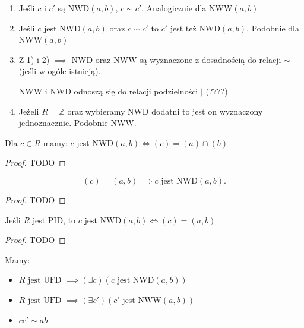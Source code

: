 \begin{remark}
	\begin{enumerate}[label=\arabic*)]
		\item Jeśli $c$ i $c'$ są $\text{NWD}\left( a,b \right) $, $c\sim c' $. Analogicznie dla $\text{NWW}\left( a,b \right) $
		\item Jeśli $c$ jest $\text{NWD}\left( a,b \right) $ oraz $c\sim c' $ to $c'$ jest też $\text{NWD}\left( a,b \right) $. Podobnie dla $\text{NWW}\left( a,b \right) $
		\item Z 1) i 2)  $\implies$ NWD oraz NWW są wyznaczone z dosadnością do relacji $\sim  $ (jeśli w ogóle istnieją).

			NWW i NWD odnoszą się do relacji podzielności $\mid $ (????)
		\item Jeżeli $R = \mathbb{Z} $ oraz wybieramy NWD dodatni to jest on wyznaczony jednoznacznie. Podobnie NWW.
	\end{enumerate}
\end{remark} 
\begin{fact}

	Dla $c\in R$ mamy:  $c$ jest $\text{NWD}\left( a,b \right)  \iff \left( c \right) = (a)\cap (b)$
\end{fact}
\begin{proof}
	 TODO
\end{proof} 
\begin{fact}

	\[
		(c) = (a,b) \implies c \text{ jest } \text{NWD}\left( a,b \right)  
	.\] 
\end{fact}
\begin{proof}
	TODO
\end{proof} 
\begin{fact}

	Jeśli $R$ jest PID, to $c$ jest $\text{NWD}\left( a,b \right) \iff \left( c \right) = \left( a,b \right) $
\end{fact}
\begin{proof}
	TODO
\end{proof} 
\begin{fact}
Mamy:

\begin{itemize}
	\item 	$R \text{ jest UFD } \implies \left(\exists c \right)\left(c \text{ jest } \text{NWD}\left( a,b \right)\right)$
	\item $R \text{ jest UFD } \implies \left(\exists c' \right)\left( c' \text{ jest }\text{NWW}\left( a,b \right)  \right)  $
	\item $cc' \sim ab $
\end{itemize}
\end{fact}
